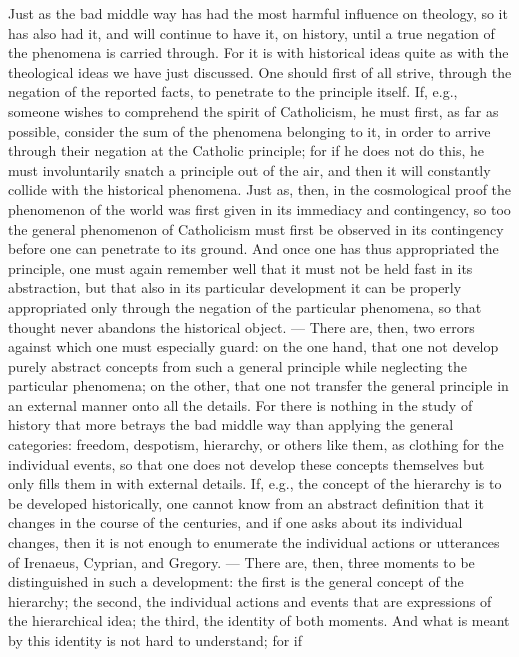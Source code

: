 \documentclass[12pt]{book}
\newcommand{\opage}[1]{\marginnote{\footnotesize\textit{[#1]}}}
\begin{document}
Just as the bad middle way has had the most harmful influence on theology, so it
has also had it, and will continue to have it, on history, until a true negation
of the phenomena is carried through. For it is with historical ideas quite as
with the theological ideas we have just discussed. One should first of all
strive, through the negation of the reported facts, to penetrate to the
principle itself. If, e.g., someone wishes to comprehend the spirit of
Catholicism, he must first, as far as possible, consider the sum of the
phenomena belonging to it, in order to arrive through their negation at the
Catholic principle; for if he does not do this, he must involuntarily snatch a
principle out of the air, and then it will constantly collide with the
historical phenomena. Just as, then, in the cosmological proof the phenomenon of
the world was first given in its immediacy and contingency, so too the general
phenomenon of Catholicism must first be observed in its contingency before one
can penetrate to its ground. And once one has thus appropriated the principle,
one must again remember well that it must not be held fast in its abstraction,
but that also in its particular development it can be properly appropriated
only through the negation of the particular phenomena, so that thought never
abandons the historical object. --- There are, then, two errors against which
one must especially guard: on the one hand, that one not develop purely abstract
concepts from such a general principle while neglecting the particular
phenomena; on the other, that one not transfer the general principle in an
external manner onto all the details. For there is nothing in the study of
history that more betrays the bad middle way than applying the general
\opage{24} categories: freedom, despotism, hierarchy, or others like them, as clothing for
the individual events, so that one does not develop these concepts themselves
but only fills them in with external details. If, e.g., the concept of the
hierarchy is to be developed historically, one cannot know from an abstract
definition that it changes in the course of the centuries, and if one asks
about its individual changes, then it is not enough to enumerate the individual
actions or utterances of Irenaeus, Cyprian, and Gregory. --- There are, then,
three moments to be distinguished in such a development: the first is the
general concept of the hierarchy; the second, the individual actions and events
that are expressions of the hierarchical idea; the third, the identity of both
moments. And what is meant by this identity is not hard to understand; for if
\end{document}
